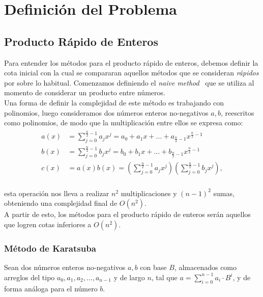 \chapter{Definición del Problema}

\section{Producto Rápido de Enteros}
Para entender los métodos para el producto rápido de enteros, debemos definir la cota inicial con la cual se compararan aquellos métodos que se consideran \textit{rápidos} por sobre lo habitual. Comenzamos definiendo el \textit{naive method}~\cite{Heideman1985} que se utiliza al momento de considerar un producto entre números.\\

Una forma de definir la complejidad de este método es trabajando con polinomios, luego consideramos dos números enteros no-negativos $a,b$, reescritos como polinomios, de modo que la multiplicación entre ellos se expresa como:\\

\begin{align}
\begin{split}
    a(x) &= \sum_{j=0}^{\frac{n}{2}-1}{a_{j}x^{j}} = a_{0} + a_{1}x + ... + a_{\frac{n}{2}-1}x^{\frac{n}{2}-1}\\
    b(x) &= \sum_{j=0}^{\frac{n}{2}-1}{b_{j}x^{j}} = b_{0} + b_{1}x + ... +b_{\frac{n}{2}-1}x^{\frac{n}{2}-1}\\
    c(x) &= a(x)b(x) = \left(\sum_{j=0}^{\frac{n}{2}-1}{a_{j}x^{j}}\right) \left(\sum_{j=0}^{\frac{n}{2}-1}{b_{j}x^{j}}\right),
\end{split}\label{poliClassic}
\end{align}\\
esta operación nos lleva a realizar $n^2$ multiplicaciones y $(n-1)^2$ sumas, obteniendo una complejidad final de $O(n^2)$.\\

A partir de esto, los métodos para el producto rápido de enteros serán aquellos que logren cotas inferiores a $O(n^2)$.

\subsection{Método de Karatsuba}
Sean dos números enteros no-negativos $a,b$ con base $B$, almacenados como arreglos del tipo $a_{0},a_{1},a_{2},...,a_{n-1}$ y de largo $n$, tal que $a=\sum^{n-1}_{i=0}{a_{i}\cdot B^{i}}$, y de forma análoga para el número $b$.\\

